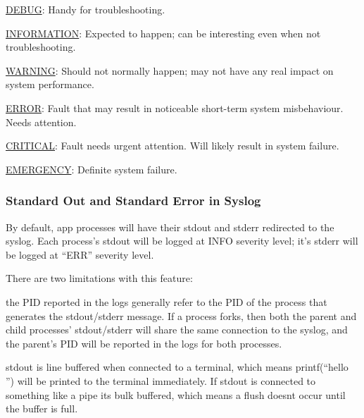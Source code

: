 \begin{DoxyItemize}
\item \hyperlink{le__log_8h_aa3de78c088c398afb23c0b582deabc0aa1a5c0e9f9bcf857faad0cc4187002479}{D\+E\+B\+U\+G}\+: Handy for troubleshooting.
\item \hyperlink{le__log_8h_aa3de78c088c398afb23c0b582deabc0aa83ea376539849ee701096fdb022e74b3}{I\+N\+F\+O\+R\+M\+A\+T\+I\+O\+N}\+: Expected to happen; can be interesting even when not troubleshooting.
\item \hyperlink{le__log_8h_aa3de78c088c398afb23c0b582deabc0aae0f565809442f7de555d36f76c36627c}{W\+A\+R\+N\+I\+N\+G}\+: Should not normally happen; may not have any real impact on system performance.
\item \hyperlink{le__log_8h_aa3de78c088c398afb23c0b582deabc0aaf1203f512370bfec7a05f8adae13c7d9}{E\+R\+R\+O\+R}\+: Fault that may result in noticeable short-\/term system misbehaviour. Needs attention.
\item \hyperlink{le__log_8h_aa3de78c088c398afb23c0b582deabc0aa298894fe77b90cb9b28f25817a620df8}{C\+R\+I\+T\+I\+C\+A\+L}\+: Fault needs urgent attention. Will likely result in system failure.
\item \hyperlink{le__log_8h_aa3de78c088c398afb23c0b582deabc0aa6843cc8d9fb10d02cad1834b236dd5cb}{E\+M\+E\+R\+G\+E\+N\+C\+Y}\+: Definite system failure.
\end{DoxyItemize}\hypertarget{c_logging_c_log_basic_defaultSyslog}{}\subsubsection{Standard Out and Standard Error in Syslog}\label{c_logging_c_log_basic_defaultSyslog}
By default, app processes will have their {\ttfamily stdout} and {\ttfamily stderr} redirected to the {\ttfamily syslog}. Each process’s stdout will be logged at I\+N\+F\+O severity level; it’s stderr will be logged at “\+E\+R\+R” severity level.

There are two limitations with this feature\+:
\begin{DoxyItemize}
\item the P\+I\+D reported in the logs generally refer to the P\+I\+D of the process that generates the stdout/stderr message. If a process forks, then both the parent and child processes’ stdout/stderr will share the same connection to the syslog, and the parent’s P\+I\+D will be reported in the logs for both processes.
\item stdout is line buffered when connected to a terminal, which means {\ttfamily printf(“hello~\newline
”)} will be printed to the terminal immediately. If stdout is connected to something like a pipe it\textquotesingle{}s bulk buffered, which means a flush doesn\textquotesingle{}t occur until the buffer is full.
\end{DoxyItemize}

